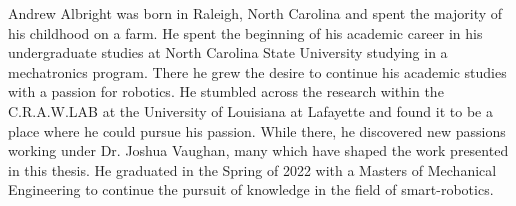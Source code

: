 \begin{biosketch} %
    Andrew Albright was born in Raleigh, North Carolina and spent the majority of his childhood on a farm. He spent the beginning of his academic career in his undergraduate studies at North Carolina State University studying in a mechatronics program. There he grew the desire to continue his academic studies with a passion for robotics. He stumbled across the research within the C.R.A.W.LAB at the University of Louisiana at Lafayette and found it to be a place where he could pursue his passion. While there, he  discovered new passions working under Dr. Joshua Vaughan, many which have shaped the work presented in this thesis. He graduated in the Spring of 2022 with a Masters of Mechanical Engineering to continue the pursuit of knowledge in the field of smart-robotics.

\end{biosketch}